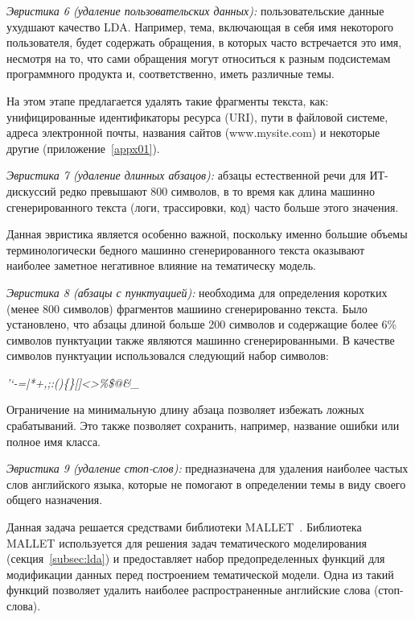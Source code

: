 \textit{Эвристика 6 (удаление пользовательских данных):} пользовательские данные ухудшают качество LDA. Например, тема, включающая в себя имя некоторого пользователя, будет содержать обращения, в которых часто встречается это имя, несмотря на то, что сами обращения могут относиться к разным подсистемам программного продукта и, соответственно, иметь различные темы. 

На этом этапе предлагается удалять такие фрагменты текста, как: унифицированные идентификаторы ресурса (URI), пути в файловой системе, адреса электронной почты, названия сайтов (www.mysite.com) и некоторые другие (приложение~\ref{appx01}).


\textit{Эвристика 7 (удаление длинных абзацов):} абзацы естественной речи для ИТ-дискуссий редко превышают 800 символов, в то время как длина машинно сгенерированного текста (логи, трассировки, код) часто больше этого значения.

Данная эвристика является особенно важной, поскольку именно большие объемы терминологически бедного машинно сгенерированного текста оказывают наиболее заметное негативное влияние на тематическу модель.

\textit{Эвристика 8 (абзацы с пунктуацией):} необходима для определения коротких (менее 800 символов) фрагментов машиино сгенерированно текста. Было установлено, что абзацы длиной больше 200 символов и содержащие более 6\% символов пунктуации также являются машинно сгенерированными. В качестве символов пунктуации использовался следующий набор символов:

\vspace{\baselineskip}
\noindent \textit{'`-=|\/*+,;:()\{\}[]<>\%\$@\&\_}
\vspace{\baselineskip}

Ограничение на минимальную длину абзаца позволяет избежать ложных срабатываний. Это также позволяет сохранить, например, название ошибки или полное имя класса.

\textit{Эвристика 9 (удаление стоп-слов):} предназначена для удаления наиболее частых слов английского языка, которые не помогают в определении темы в виду своего общего назначения. 

Данная задача решается средствами библиотеки MALLET~\cite{MALLET}. Библиотека MALLET используется для решения задач тематического моделирования (секция~\ref{subsec:lda}) и предоставляет набор предопределенных функций для модификации данных перед построением тематической модели. Одна из такий функций позволяет удалить наиболее распространенные английские слова (стоп-слова).

